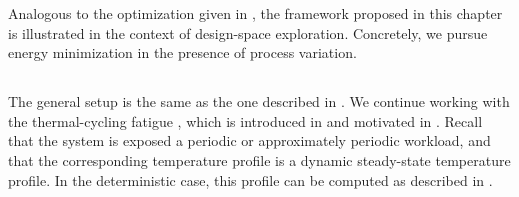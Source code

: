 Analogous to the optimization given in , the framework
proposed in this chapter is illustrated in the context of design-space
exploration. Concretely, we pursue energy minimization in the presence of
process variation.

\subsection{\problemtitle}

The general setup is the same as the one described in
. We continue working with the thermal-cycling
fatigue \cite{jedec2016}, which is introduced in 
and motivated in . Recall that the system is exposed a
periodic or approximately periodic workload, and that the corresponding
temperature profile is a dynamic steady-state temperature profile. In the
deterministic case, this profile can be computed as described in
.

